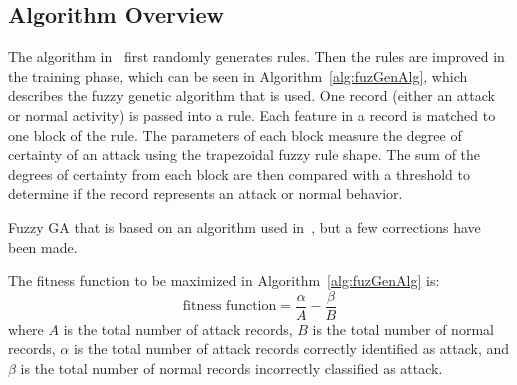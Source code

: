 \documentclass{sig-alternate}
\begin{document}
\subsection{Algorithm Overview}
The algorithm in~\cite{6496342, 6559603} first randomly generates rules. Then the rules are improved in the training phase, which can be seen in Algorithm~\ref{alg:fuzGenAlg}, which describes the fuzzy genetic algorithm that is used. One record (either an attack or normal activity) is passed into a rule. Each feature in a record is matched to one block of the rule. The parameters of each block measure the degree of certainty of an attack using the trapezoidal fuzzy rule shape. The sum of the degrees of certainty from each block are then compared with a threshold to determine if the record represents an attack or normal behavior.

\begin{algorithm}[t]
\caption{Fuzzy GA that is based on an algorithm used in~\cite{6496342, 6559603}, but a few corrections have been made.}
\label{alg:fuzGenAlg}
\begin{algorithmic}

    \ENDFOR
    
      \ELSE {}
    \ENDIF
  \ENDFOR
  
\ENDFOR
{}
\end{algorithmic}
\end{algorithm}


The fitness function to be maximized in Algorithm~\ref{alg:fuzGenAlg} is:
\begin{equation*}
\textrm{fitness function} = \frac{\alpha}{A} - \frac{\beta}{B}
\end{equation*}
where $A$ is the total number of attack records, $B$ is the total number of normal records, $\alpha$ is the total number of attack records correctly identified as attack, and $\beta$ is the total number of normal records incorrectly classified as attack.
\end{document}
